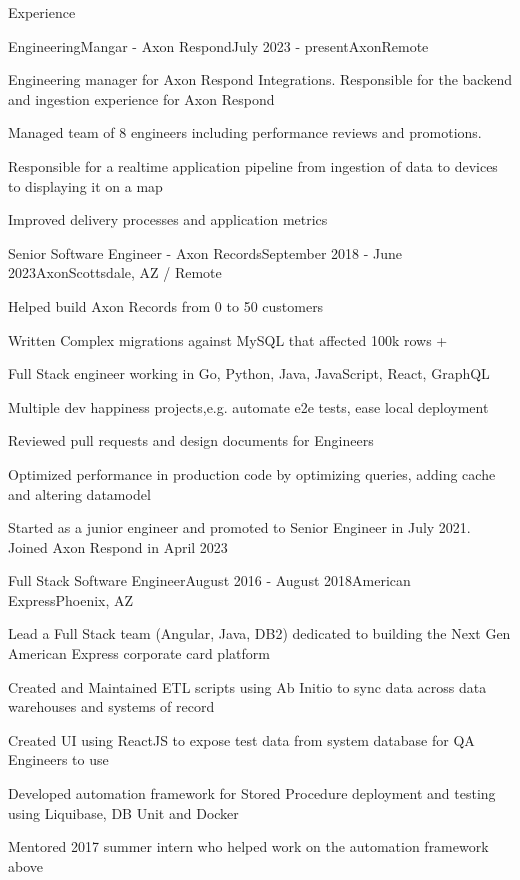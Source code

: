 \documentclass{resume} %
\begin{document}
\begin{rSection}{Experience}

\begin{rSubsection}{EngineeringMangar - Axon Respond}{July 2023 - present}{Axon}{Remote}
\item Engineering manager for Axon Respond Integrations. Responsible for the backend and ingestion experience for Axon Respond
\item Managed team of 8 engineers including performance reviews and promotions.
\item Responsible for a realtime application pipeline from ingestion of data to devices to displaying it on a map
\item Improved delivery processes and application metrics

\end{rSubsection}

\begin{rSubsection}{Senior Software Engineer - Axon Records}{September 2018 - June 2023}{Axon}{Scottsdale, AZ / Remote}
\item Helped build Axon Records from 0 to 50 customers
\item Written Complex migrations against MySQL that affected 100k rows + 
\item Full Stack engineer working in Go, Python, Java, JavaScript, React, GraphQL
\item Multiple dev happiness projects,e.g. automate e2e tests, ease local deployment
\item Reviewed pull requests and design documents for Engineers
\item Optimized performance in production code by optimizing queries, adding cache and altering datamodel
\item Started as a junior engineer and promoted to Senior Engineer in July 2021. Joined Axon Respond in April 2023

\end{rSubsection}

\begin{rSubsection}{Full Stack Software Engineer}{August 2016 - August 2018}{American Express}{Phoenix, AZ}
\item Lead a Full Stack team (Angular, Java, DB2) dedicated to building the Next Gen American Express corporate card platform
\item Created and Maintained ETL scripts using Ab Initio to sync data across data warehouses and systems of record
\item Created UI using ReactJS to expose test data from system database for QA Engineers to use
\item Developed automation framework for Stored Procedure deployment and testing using Liquibase, DB Unit and Docker
\item Mentored 2017 summer intern who helped work on the automation framework above


\end{rSubsection}
\end{rSection}
\end{document}
